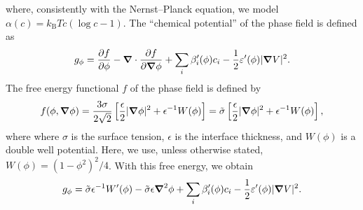 \documentclass[preprint,pre,superscriptaddress,a4paper]{revtex4-1}
\newcommand{\gv}[1]{\ensuremath{\mbox{\boldmath$ #1 $}}}
\newcommand{\pd}[2]{\frac{\partial #1}{\partial #2}}
\newcommand{\grad}[1]{\gv{\nabla} #1} %
\renewcommand{\div}[1]{\gv{\nabla} \cdot #1} %
\newcommand{\laplacian}[1]{\grad^2 #1}
\begin{document}
where, consistently with the Nernst--Planck equation, we model $\alpha(c) = k_{\mathrm{B}} T c (\log c - 1) $.
The ``chemical potential'' of the phase field is defined as
\begin{equation}
  g_\phi = \pd f \phi - \div \pd f {\grad \phi} + \sum_i \beta_i ' (\phi) c_i - \frac 1 2 \varepsilon'(\phi) | \grad V |^2 .
\end{equation}
The free energy functional $f$ of the phase field is defined by
\begin{equation}
  f(\phi, \grad \phi) = \frac{3 \sigma}{2 \sqrt{2}} \left[ \frac{\epsilon}{2} |\grad \phi|^2 + \epsilon^{-1} W(\phi) \right] = \tilde \sigma \left[ \frac{\epsilon}{2} |\grad \phi|^2 + \epsilon^{-1} W(\phi) \right],
\end{equation}
where where $\sigma$ is the surface tension, $\epsilon$ is the interface thickness, and $W(\phi)$ is a double well potential.
Here, we use, unless otherwise stated, $W(\phi) = (1-\phi^2)^2/4$.
With this free energy, we obtain
\begin{equation}
  g_\phi = \tilde\sigma\epsilon^{-1}W'(\phi) - \tilde\sigma\epsilon\laplacian\phi + \sum_i \beta_i ' (\phi) c_i - \frac 1 2 \varepsilon'(\phi) | \grad V |^2 .
\end{equation}
\end{document}
